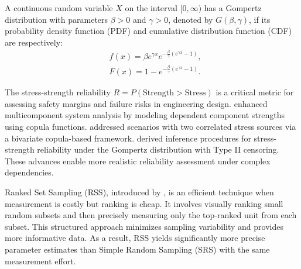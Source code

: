 \documentclass[twoside]{article}
\begin{document}
\begin{dfn}\label{df1}
A continuous random variable $X$ on the interval $[0,\infty)$ has a Gompertz distribution with parameters $\beta>0$ and $\gamma>0$, denoted by $G(\beta, \gamma)$, if its probability density function (PDF) and cumulative distribution function (CDF) are respectively:
\begin{align}\label{1}
& f(x)=\beta e^{\gamma x}e^{-\frac{\beta}{\gamma}(e^{\gamma x}-1)},\\ \label{2}
& F(x)=1-e^{-\frac{\beta}{\gamma}(e^{\gamma x}-1)}.
\end{align}
\end{dfn}


The stress-strength reliability $R = P(\text{Strength} > \text{Stress})$ is a critical metric for assessing safety margins and failure risks in engineering design. \cite{hakamipour2025stress} enhanced multicomponent system analysis by modeling dependent component strengths using copula functions. \cite{hudaverdi2023copula} addressed scenarios with two correlated stress sources via a bivariate copula-based framework. \cite{karimi2022statistical} derived inference procedures for stress-strength reliability under the Gompertz distribution with Type II censoring. These advances enable more realistic reliability assessment under complex dependencies. %

Ranked Set Sampling (RSS), introduced by \cite{mcintyre1952method}, is an efficient technique when measurement is costly but ranking is cheap. It involves visually ranking small random subsets and then precisely measuring only the top-ranked unit from each subset. This structured approach minimizes sampling variability and provides more informative data. As a result, RSS yields significantly more precise parameter estimates than Simple Random Sampling (SRS) with the same measurement effort.
\end{document}
